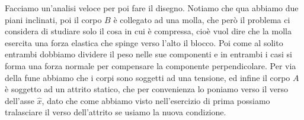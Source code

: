 \documentclass{rapport}
\begin{document}
Facciamo un'analisi veloce per poi fare il disegno. Notiamo che qua abbiamo due piani inclinati, poi il corpo $B$ è collegato ad una molla, che però il problema ci considera di studiare solo il cosa in cui è compressa, cioè vuol dire che la molla esercita una forza elastica che spinge verso l'alto il blocco. Poi come al solito entrambi dobbiamo dividere il peso nelle sue componenti e in entrambi i casi si forma una forza normale per compensare la componente perpendicolare. Per via della fune abbiamo che i corpi sono soggetti ad una tensione, ed infine il corpo $A$ è soggetto ad un attrito statico, che per convenienza lo poniamo verso il verso dell'asse $\hat{x}$, dato che come abbiamo visto nell'esercizio di prima possiamo tralasciare il verso dell'attrito se usiamo la nuova condizione. 
\begin{center}
\end{center}
\end{document}
